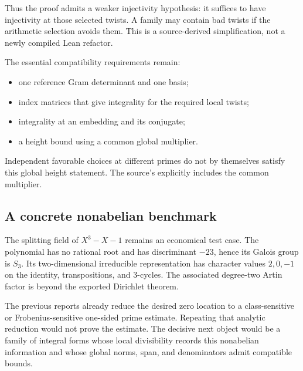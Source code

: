 Thus the proof admits a weaker injectivity hypothesis: it suffices to have injectivity at those selected twists. A family may contain bad twists if the arithmetic selection avoids them. This is a source-derived simplification, not a newly compiled Lean refactor.

The essential compatibility requirements remain:
\begin{itemize}
\item one reference Gram determinant and one basis;
\item index matrices that give integrality for the required local twists;
\item integrality at an embedding and its conjugate;
\item a height bound using a common global multiplier.
\end{itemize}
Independent favorable choices at different primes do not by themselves satisfy this global height statement. The source's  explicitly includes the common multiplier.

\subsection{A concrete nonabelian benchmark}
The splitting field of $X^3-X-1$ remains an economical test case. The polynomial has no rational root and has discriminant $-23$, hence its Galois group is $S_3$. Its two-dimensional irreducible representation has character values $2,0,-1$ on the identity, transpositions, and $3$-cycles. The associated degree-two Artin factor is beyond the exported Dirichlet theorem.

The previous reports already reduce the desired zero location to a class-sensitive or Frobenius-sensitive one-sided prime estimate. Repeating that analytic reduction would not prove the estimate. The decisive next object would be a family of integral forms whose local divisibility records this nonabelian information and whose global norms, span, and denominators admit compatible bounds.

